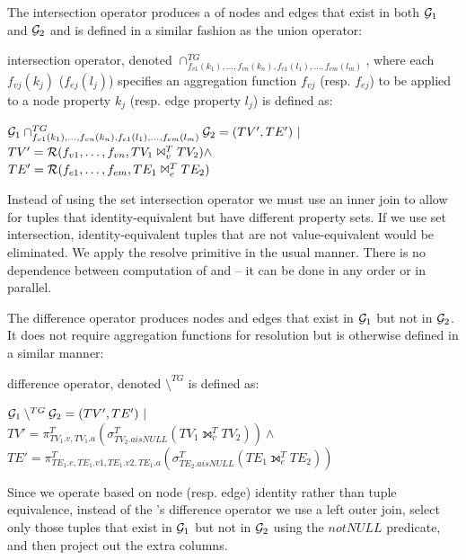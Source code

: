 The \tg intersection operator produces a \tg of nodes and edges that
exist in both $\mathcal{G}_1$ and $\mathcal{G}_2$ and is defined in a similar fashion
as the union operator:

\begin{definition}[Intersection]
\label{def:intertg}
\tg intersection operator, denoted
$\cap^{TG}_{f_{v1}(k_1),\ldots,f_{vn}(k_n),f_{e1}(l_1),\ldots,f_{em}(l_m)}$,
where each $f_{vj}(k_j)$ ($f_{ej}(l_j)$) specifies an aggregation
function $f_{vj}$ (resp. $f_{ej}$) to be applied to a node property
$k_j$ (resp. edge property $l_j$) is defined as:

$\mathcal{G}_1 \cap^{TG}_{f_{v1}(k_1),\ldots,f_{vn}(k_n),f_{e1}(l_1),\ldots,f_{em}(l_m)} \mathcal{G}_2 = (TV', TE') ~|~ $\\$TV' = \mathcal{R}(f_{v1},\ldots,f_{vn},TV_1 \Join^T_{v} TV_2) \land $\\$TE' = \mathcal{R}(f_{e1},\ldots,f_{em},TE_1 \Join^T_{e} TE_2)$
\end{definition}

Instead of using the \tra set intersection operator we must use an
inner join to allow for tuples that identity-equivalent but have
different property sets.  If we use set intersection,
identity-equivalent tuples that are not value-equivalent would be
eliminated.  We apply the resolve primitive in the usual manner.
There is no dependence between computation of \tv and \te -- it can be
done in any order or in parallel.

The difference operator produces nodes and edges that exist in
$\mathcal{G}_1$ but not in $\mathcal{G}_2$.  It does not require aggregation
functions for resolution but is otherwise defined in a similar manner:

\begin{definition}[Difference]
\label{def:difftg}
\tg difference operator, denoted
$\setminus^{TG}$ is defined as:

$\mathcal{G}_1 \setminus^{TG} \mathcal{G}_2 = (TV', TE') ~|~ $\\$TV' = \pi^T_{TV_1.v,TV_1.a}(\sigma^T_{TV_2.a is NULL}(TV_1 \leftouterjoin^T_{v} TV_2)) \land $\\$TE' = \pi^T_{TE_1.e,TE_1.v1,TE_1.v2,TE_1.a}(\sigma^T_{TE_2.a is NULL}(TE_1 \leftouterjoin^T_{e} TE_2))$
\end{definition}

Since we operate based on node (resp. edge) identity rather than tuple
equivalence, instead of the \tra's difference operator we use a left
outer join, select only those tuples that exist in $\mathcal{G}_1$ but not in
$\mathcal{G}_2$ using the $not NULL$ predicate, and then project out the
extra columns.

